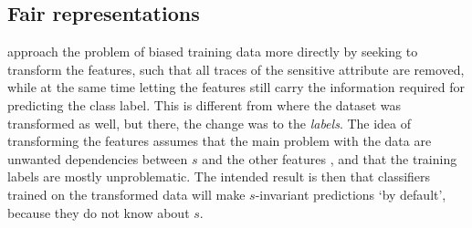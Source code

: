 \subsection{Fair representations}\label{sec:fair-representation}
\citet{zemel2013learning} approach the problem of biased training data more directly
by seeking to transform the features, such that all traces of the sensitive attribute are removed,
while at the same time letting the features still carry the information required for predicting the class label.
This is different from \citet{kamiran2009classifying} where the dataset was transformed as well,
but there, the change was to the \emph{labels}.
The idea of transforming the features assumes that the main problem with the data
are unwanted dependencies between $s$ and the other features \citep[called \emph{latent prejudice} in ][]{kamishima2012fairness},
and that the training labels are mostly unproblematic.
The intended result is then that classifiers trained on the transformed data will make $s$-invariant predictions `by default',
because they do not know about $s$.

